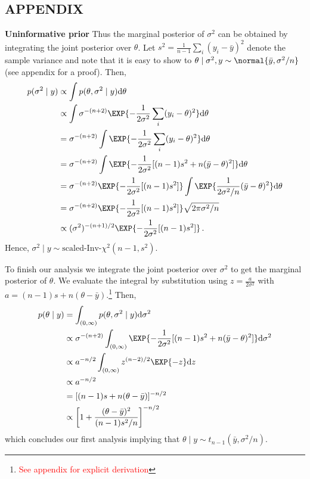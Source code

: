 \subsection{APPENDIX}
\textbf{Uninformative prior}
Thus the marginal posterior of $\sigma^2$ can be obtained by integrating the joint posterior
over $\theta$. Let $s^2 = \frac{1}{n-1} \sum_i (y_i - \bar{y})^2$ denote the sample
variance and note that it is easy to show to
$\theta \mid \sigma^2, y \sim \normal{\bar{y}, \sigma^2/n}$ (see appendix for a proof).
Then,
\begin{align}
  p(\sigma^2 \mid y) &\propto \int p(\theta, \sigma^2 \mid y) \mathrm{d} \theta\\
  &\propto \int \sigma^{-(n+2)} \EXP{-\frac{1}{2\sigma^2}\sum_i (y_i - \theta)^2} \mathrm{d} \theta\\
  &= \sigma^{-(n+2)} \int \EXP{-\frac{1}{2\sigma^2}\sum_i (y_i - \theta)^2} \mathrm{d} \theta\\
  &= \sigma^{-(n+2)} \int \EXP{-\frac{1}{2\sigma^2}[(n-1) s^2 + n(\bar{y} - \theta)^2]} \mathrm{d} \theta\\
  &= \sigma^{-(n+2)} \EXP{-\frac{1}{2\sigma^2}[(n-1) s^2]} \int \EXP{\frac{1}{2\sigma^2/n}(\bar{y} - \theta)^2} \mathrm{d} \theta\\
  &= \sigma^{-(n+2)} \EXP{-\frac{1}{2\sigma^2}[(n-1) s^2]} \sqrt{2 \pi \sigma^2 / n} \\
  &\propto (\sigma^2)^{-(n+1)/2} \EXP{-\frac{1}{2\sigma^2}[(n-1) s^2]} \,.
\end{align}
Hence, $\sigma^2 \mid y \sim \text{scaled-Inv-} \chi^2(n-1, s^2)$.

To finish our analysis we integrate the joint posterior over $\sigma^2$ to get
the marginal posterior of $\theta$. We evaluate the integral by substitution using
$z = \frac{a}{2 \sigma^2}$ with $a = (n-1)s + n(\theta - \bar{y})$.\footnote{\textcolor{red}{See appendix for explicit derivation}}
Then,
\begin{align}
  p(\theta \mid y) &= \int_{(0, \infty)} p(\theta, \sigma^2 \mid y) \mathrm{d}\sigma^2\\
  &\propto \sigma^{-(n+2)} \int_{(0, \infty)} \EXP{-\frac{1}{2\sigma^2}[(n-1) s^2 + n(\bar{y} - \theta)^2]} \mathrm{d} \sigma^2\\
  &\propto a^{-n/2} \int_{(0, \infty)} z^{(n-2)/2}\EXP{-z} \mathrm{d}z\\
  &\propto a^{-n/2}\\
  &= [(n-1)s + n(\theta - \bar{y})]^{-n/2}\\
  &\propto \left[1 + \frac{(\theta - \bar{y})^2}{(n-1) s^2 / n}\right]^{-n/2} \,
\end{align}
which concludes our first analysis implying that $\theta \mid y \sim t_{n-1}(\bar{y}, \sigma^2/n)$.




